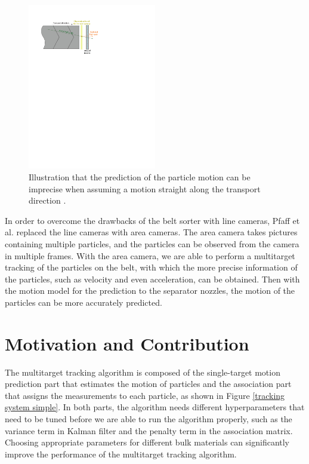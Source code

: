 \begin{figure}[htb]
\centering
\includegraphics[width=0.5\textwidth]{figures/line camera.pdf}
\caption{Illustration that the prediction of the particle motion can be imprecise when assuming a motion straight along the transport direction \cite{pfaff2019multitarget}.}
\label{line camera error}
\end{figure}

In order to overcome the drawbacks of the belt sorter with line cameras, Pfaff et al. \cite{pfaff2019multitarget} replaced the line cameras with area cameras. The area camera takes pictures containing multiple particles, and the particles can be observed from the camera in multiple frames. With the area camera, we are able to perform a multitarget tracking of the particles on the belt, with which the more precise information of the particles, such as velocity and even acceleration, can be obtained. Then with the motion model for the prediction to the separator nozzles, the motion of the particles can be more accurately predicted.

\section{Motivation and Contribution}

The multitarget tracking algorithm is composed of the single-target motion prediction part that estimates the motion of particles and the association part that assigns the measurements to each particle, as shown in Figure \ref{tracking system simple}. In both parts, the algorithm needs different hyperparameters that need to be tuned before we are able to run the algorithm properly, such as the variance term in Kalman filter and the penalty term in the association matrix. Choosing appropriate parameters for different bulk materials can significantly improve the performance of the multitarget tracking algorithm.

